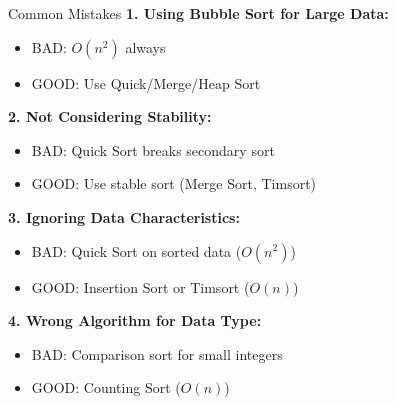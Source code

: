 \documentclass[aspectratio=169]{beamer}
\begin{document}
\begin{frame}{Common Mistakes}
  \textbf{1. Using Bubble Sort for Large Data:}
  \begin{itemize}
    \item {\color{red} BAD}: $O(n^2)$ always
    \item {\color{blue} GOOD}: Use Quick/Merge/Heap Sort
  \end{itemize}

  \vspace{0.2cm}
  \textbf{2. Not Considering Stability:}
  \begin{itemize}
    \item {\color{red} BAD}: Quick Sort breaks secondary sort
    \item {\color{blue} GOOD}: Use stable sort (Merge Sort, Timsort)
  \end{itemize}

  \vspace{0.2cm}
  \textbf{3. Ignoring Data Characteristics:}
  \begin{itemize}
    \item {\color{red} BAD}: Quick Sort on sorted data ($O(n^2)$)
    \item {\color{blue} GOOD}: Insertion Sort or Timsort ($O(n)$)
  \end{itemize}

  \vspace{0.2cm}
  \textbf{4. Wrong Algorithm for Data Type:}
  \begin{itemize}
    \item {\color{red} BAD}: Comparison sort for small integers
    \item {\color{blue} GOOD}: Counting Sort ($O(n)$)
  \end{itemize}
\end{frame}
\end{document}
